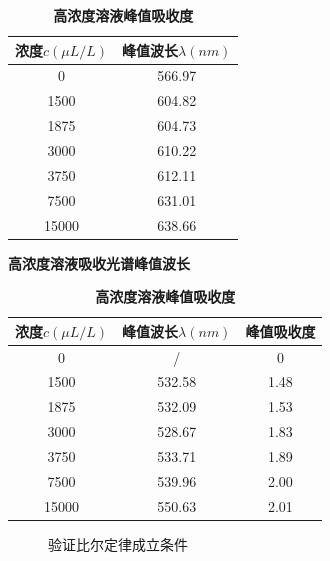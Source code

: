 \documentclass[12pt,a4paper,UTF8]{ctexart}
\begin{document}
\begin{table}[htbp]
	\centering
	\begin{minipage}{0.45\linewidth}
		\begin{tabular}{cc}
			\toprule
			浓度$c(\mu L/L)$ &峰值波长$\lambda (nm)$ \\
			\midrule
			0 &566.97 \\		
			1500 &604.82 \\
			1875 &604.73 \\
			3000 &610.22 \\
			3750 &612.11 \\
			7500 &631.01 \\
			15000 &638.66 \\
			\bottomrule
		\end{tabular}
		\caption{\textbf{高浓度溶液吸收光谱峰值波长}}
		\label{tab:3.1}
	\end{minipage}
	\begin{minipage}{0.45\linewidth}
		\begin{tabular}{ccc}
			\toprule
			浓度$c(\mu L/L)$ &峰值波长$\lambda (nm)$ &峰值吸收度 \\
			\midrule
			0 &/ &0 \\		
			1500 &532.58 &1.48 \\
			1875 &532.09 &1.53 \\
			3000 &528.67 &1.83 \\
			3750 &533.71 &1.89 \\
			7500 &539.96 &2.00 \\
			15000 &550.63 &2.01 \\
			\bottomrule
		\end{tabular}
		\caption{\textbf{高浓度溶液峰值吸收度}}
		\label{tab:3.2}
	\end{minipage}
\end{table}

\begin{figure}[htbp]
	\centering
	\caption{验证比尔定律成立条件}
\end{figure}
\end{document}
